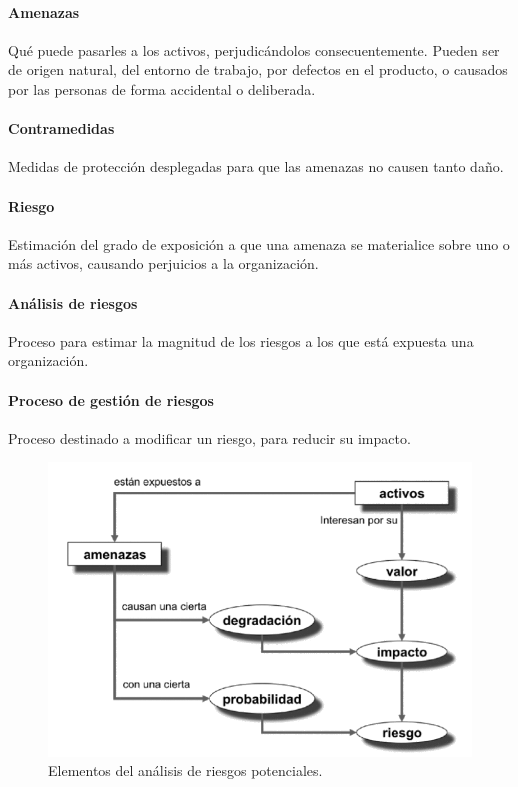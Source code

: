 \paragraph{Amenazas} Qué puede pasarles a los activos, perjudicándolos consecuentemente. Pueden ser de origen natural, del entorno de trabajo, por defectos en el producto, o causados por las personas de forma accidental o deliberada.

\paragraph{Contramedidas} Medidas de protección desplegadas para que las amenazas no causen tanto daño.

\paragraph{Riesgo} Estimación del grado de exposición a que una amenaza se materialice sobre uno o más activos, causando perjuicios a la organización.

\paragraph{Análisis de riesgos} Proceso para estimar la magnitud de los riesgos a los que está expuesta una organización.

\paragraph{Proceso de gestión de riesgos} Proceso destinado a modificar un riesgo, para reducir su impacto.

\begin{figure}[H]
   \centering
   \includegraphics[width=0.6\linewidth]{Resources/Tema3/relacionesDefinicionesRiesgos.png}
   \caption{Elementos del análisis de riesgos potenciales.}
   \label{fig:relacionesDefinicionesRiesgos}
\end{figure}

